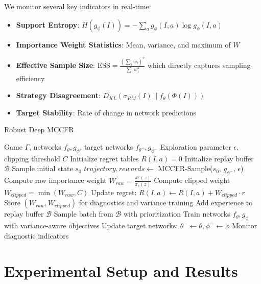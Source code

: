 \documentclass[12pt,a4paper]{article}
\begin{document}
We monitor several key indicators in real-time:

\begin{itemize}
\item \textbf{Support Entropy}: $H(g_\phi(I)) = -\sum_a g_\phi(I, a) \log g_\phi(I, a)$
\item \textbf{Importance Weight Statistics}: Mean, variance, and maximum of $W$
\item \textbf{Effective Sample Size}: $\text{ESS} = \frac{(\sum_i w_i)^2}{\sum_i w_i^2}$ which directly captures sampling efficiency
\item \textbf{Strategy Disagreement}: $D_{KL}(\sigma_{RM}(I) \| f_\theta(\Phi(I)))$
\item \textbf{Target Stability}: Rate of change in network predictions
\end{itemize}

\begin{algorithm}[H]
\caption{Robust Deep MCCFR}
\begin{algorithmic}
\REQUIRE Game $\Gamma$, networks $f_\theta, g_\phi$, target networks $f_{\theta^-}, g_{\phi^-}$
\REQUIRE Exploration parameter $\epsilon$, clipping threshold $C$
\STATE Initialize regret tables $R(I, a) = 0$
\STATE Initialize replay buffer $\mathcal{B}$
    \STATE Sample initial state $s_0$
    \STATE $trajectory, rewards \leftarrow$ MCCFR-Sample($s_0$, $g_{\phi^-}$, $\epsilon$)
        \STATE Compute raw importance weight $W_{raw} = \frac{\pi^\sigma(z)}{\pi_s(z)}$
        \STATE Compute clipped weight $W_{clipped} = \min(W_{raw}, C)$ 
        \STATE Update regret: $R(I, a) \leftarrow R(I, a) + W_{clipped} \cdot r$
        \STATE Store $(W_{raw}, W_{clipped})$ for diagnostics and variance training
        \STATE Add experience to replay buffer $\mathcal{B}$
    \ENDFOR
        \STATE Sample batch from $\mathcal{B}$ with prioritization
        \STATE Train networks $f_\theta, g_\phi$ with variance-aware objectives
    \ENDIF
        \STATE Update target networks: $\theta^- \leftarrow \theta, \phi^- \leftarrow \phi$
    \ENDIF
    \STATE Monitor diagnostic indicators
\ENDFOR
\end{algorithmic}
\end{algorithm}

\section{Experimental Setup and Results}
\label{sec:experiments}
\end{document}
